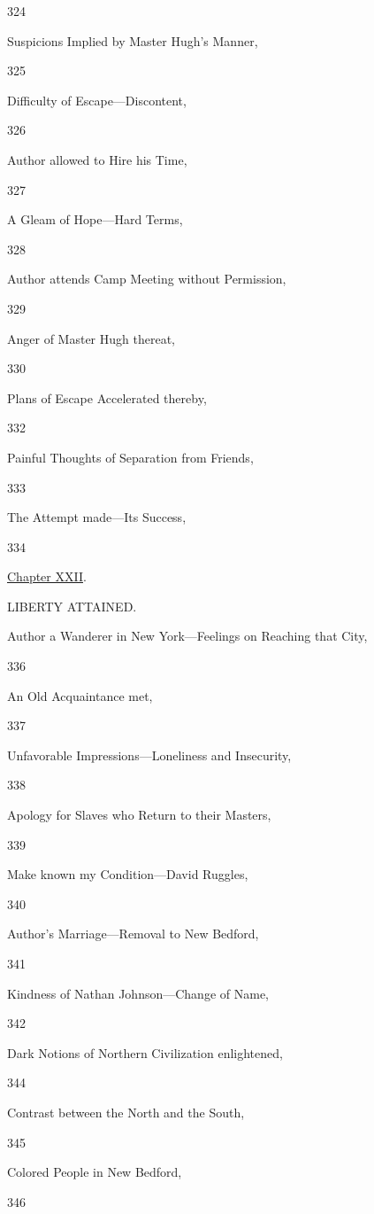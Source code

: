 324

Suspicions Implied by Master Hugh's Manner,

325

Difficulty of Escape---Discontent,

326

Author allowed to Hire his Time,

327

A Gleam of Hope---Hard Terms,

328

Author attends Camp Meeting without Permission,

329

Anger of Master Hugh thereat,

330

Plans of Escape Accelerated thereby,

332

Painful Thoughts of Separation from Friends,

333

The Attempt made---Its Success,

334

\href{/wiki/My_Bondage_and_My_Freedom_(1855)/Chapter_XXII}{Chapter
XXII}.

LIBERTY ATTAINED.

Author a Wanderer in New York---Feelings on Reaching that City,

{336}

An Old Acquaintance met,

337

Unfavorable Impressions---Loneliness and Insecurity,

338

Apology for Slaves who Return to their Masters,

339

Make known my Condition---David Ruggles,

340

Author's Marriage---Removal to New Bedford,

341

Kindness of Nathan Johnson---Change of Name,

342

Dark Notions of Northern Civilization enlightened,

344

Contrast between the North and the South,

345

Colored People in New Bedford,

346

